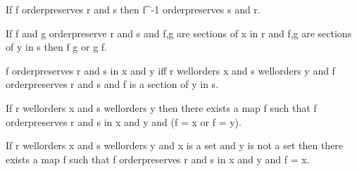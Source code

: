 \documentclass[a4paper,draft]{amsproc}
\begin{document}
\begin{forthel}
\begin{theorem}[96b]
If f orderpreserves r and s then f^{-1} orderpreserves s and r.
\end{theorem}

\begin{theorem}[97]
If f and g orderpreserve r and s and \domain f,\domain g are sections of x in r
and \range f,\range g are sections of y in s then f \subset g or g \subset f.
\end{theorem}

\begin{definition}[98]
f orderpreserves r and s in x and y iff r wellorders x and s wellorders y and
f orderpreserves r and s and \domain f is a section of y in s.
\end{definition}

\begin{theorem}[99]
If r wellorders x and s wellorders y then there exists a map f such that
f orderpreserves r and s in x and y and (\domain f = x or \range f = y).
\end{theorem}

\begin{theorem}[100]
If r wellorders x and s wellorders y and x is a set and y is not a set
then there exists a %
 map f such that f orderpreserves r and s in x and y
and \domain f = x.
\end{theorem}

\end{forthel}
\end{document}
